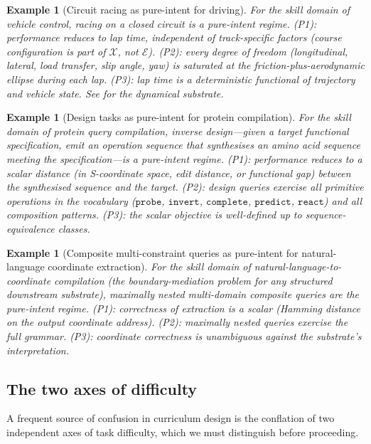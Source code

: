 \documentclass[twocolumn,11pt,a4paper]{article}
\newtheorem{example}[theorem]{Example}
\newcommand{\cX}{\mathcal{X}}
\newcommand{\cE}{\mathcal{E}}
\begin{document}
\begin{example}[Circuit racing as pure-intent for driving]
\label{ex:f1}
For the skill domain of vehicle control, racing on a closed circuit is a pure-intent regime. (P1): performance reduces to lap time, independent of track-specific factors (course configuration is part of $\cX$, not $\cE$). (P2): every degree of freedom (longitudinal, lateral, load transfer, slip angle, yaw) is saturated at the friction-plus-aerodynamic ellipse during each lap. (P3): lap time is a deterministic functional of trajectory and vehicle state. See \citet{milliken1995race} for the dynamical substrate.
\end{example}

\begin{example}[Design tasks as pure-intent for protein compilation]
\label{ex:design}
For the skill domain of protein query compilation, inverse design---given a target functional specification, emit an operation sequence that synthesises an amino acid sequence meeting the specification---is a pure-intent regime. (P1): performance reduces to a scalar distance (in S-coordinate space, edit distance, or functional gap) between the synthesised sequence and the target. (P2): design queries exercise all primitive operations in the vocabulary ($\mathtt{probe}$, $\mathtt{invert}$, $\mathtt{complete}$, $\mathtt{predict}$, $\mathtt{react}$) and all composition patterns. (P3): the scalar objective is well-defined up to sequence-equivalence classes.
\end{example}

\begin{example}[Composite multi-constraint queries as pure-intent for natural-language coordinate extraction]
\label{ex:composite}
For the skill domain of natural-language-to-coordinate compilation (the boundary-mediation problem for any structured downstream substrate), maximally nested multi-domain composite queries are the pure-intent regime. (P1): correctness of extraction is a scalar (Hamming distance on the output coordinate address). (P2): maximally nested queries exercise the full grammar. (P3): coordinate correctness is unambiguous against the substrate's interpretation.
\end{example}

\subsection{The two axes of difficulty}

A frequent source of confusion in curriculum design is the conflation of two independent axes of task difficulty, which we must distinguish before proceeding.
\end{document}
